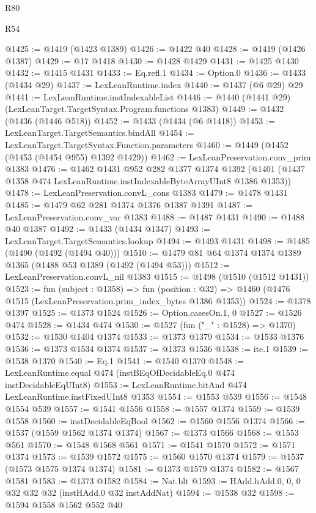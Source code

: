 \begin{lexlean}{R80}
\begin{lexlean}{R54}
\begin{coremodule}
{{{{{{{{{{{{{{{{{{{{{{{{{{{{{{{{{{{{{{{{{{{{{{{{{{@1425 := @1419 (@1423 @1389)
@1426 := @1422 @40
@1428 := @1419 (@1426 @1387)
@1429 := @17 @1418
@1430 := @1428 @1429
@1431 := @1425 @1430
@1432 := @1415 @1431
@1433 := Eq.refl.{1}
@1434 := Option.{0}
@1436 := @1433 (@1434 @29)
@1437 := LexLeanRuntime.index
@1440 := @1437 (@6 @29) @29
@1441 := LexLeanRuntime.instIndexableList
@1446 := @1440 (@1441 @29) (LexLeanTarget.TargetSyntax.Program.functions @1383)
@1449 := @1432 (@1436 (@1446 @518))
@1452 := @1433 (@1434 (@6 @1418))
@1453 := LexLeanTarget.TargetSemantics.bindAll
@1454 := LexLeanTarget.TargetSyntax.Function.parameters
@1460 := @1449 (@1452 (@1453 (@1454 @955) @1392 @1429))
@1462 := LexLeanPreservation.conv_prim @1383
@1476 := @1462
    @1431
    @952
    @282
    @1377
    @1374
    @1392
    (@1401 (@1437 @1358 @474 LexLeanRuntime.instIndexableByteArrayUInt8 @1386 @1353))
@1478 := LexLeanPreservation.convL_cons @1383
@1479 := @1478 @1431
@1485 := @1479 @62 @281 @1374 @1376 @1387 @1391
@1487 := LexLeanPreservation.conv_var @1383
@1488 := @1487 @1431
@1490 := @1488 @40 @1387
@1492 := @1433 (@1434 @1347)
@1493 := LexLeanTarget.TargetSemantics.lookup
@1494 := @1493 @1431
@1498 := @1485 (@1490 (@1492 (@1494 @40)))
@1510 := @1479 @81 @64 @1374 @1374 @1389 @1365 (@1488 @53 @1389 (@1492 (@1494 @53)))
@1512 := LexLeanPreservation.convL_nil @1383
@1515 := @1498 (@1510 (@1512 @1431))
@1523 := fun (subject : @1358) =>
  fun (position : @32) => @1460 (@1476 @1515 (LexLeanPreservation.prim_index_bytes @1386 @1353))
@1524 := @1378 @1397
@1525 := @1373 @1524
@1526 := Option.casesOn.{1, 0}
@1527 := @1526 @474
@1528 := @1434 @474
@1530 := @1527 (fun ("_" : @1528) => @1370)
@1532 := @1530 @1404 @1374
@1533 := @1373 @1379
@1534 := @1533 @1376
@1536 := @1373 @1534 @1374
@1537 := @1373 @1536
@1538 := ite.{1}
@1539 := @1538 @1370
@1540 := Eq.{1}
@1541 := @1540 @1370
@1548 := LexLeanRuntime.equal @474 (instBEqOfDecidableEq.{0} @474 instDecidableEqUInt8)
@1553 := LexLeanRuntime.bitAnd @474 LexLeanRuntime.instFixedUInt8 @1353
@1554 := @1553 @539
@1556 := @1548 @1554 @539
@1557 := @1541 @1556
@1558 := @1557 @1374
@1559 := @1539 @1558
@1560 := instDecidableEqBool
@1562 := @1560 @1556 @1374
@1566 := @1537 (@1559 @1562 @1374 @1374)
@1567 := @1373 @1566
@1568 := @1553 @561
@1570 := @1548 @1568 @561
@1571 := @1541 @1570
@1572 := @1571 @1374
@1573 := @1539 @1572
@1575 := @1560 @1570 @1374
@1579 := @1537 (@1573 @1575 @1374 @1374)
@1581 := @1373 @1579 @1374
@1582 := @1567 @1581
@1583 := @1373 @1582
@1584 := Nat.blt
@1593 := HAdd.hAdd.{0, 0, 0} @32 @32 @32 (instHAdd.{0} @32 instAddNat)
@1594 := @1538 @32
@1598 := @1594 @1558 @1562 @552 @40
}}}}}}}}}}}}}}}}}}}}}}}}}}}}}}}}}}}}}}}}}}}}}}}}}}
\end{coremodule}
\end{lexlean}
\end{lexlean}
